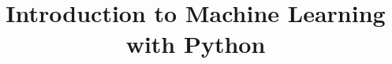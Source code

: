 \documentclass[xcolor=dvipsnames,compress,t,pdf,9pt]{beamer}
\title[\insertframenumber /\inserttotalframenumber]{Introduction to Machine Learning with Python}
\begin{document}
	\begin{frame}
	\titlepage
	\end{frame}
	
%	
	
	
\end{document}
